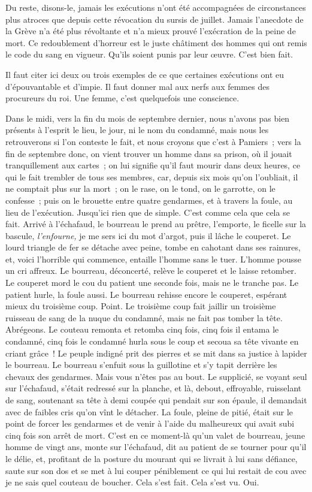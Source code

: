 \documentclass[french,twoside]{book} %
\begin{document}
Du reste, disons-le, jamais les exécutions n’ont été accompagnées de circonstances plus atroces que depuis cette révocation du sursis de juillet. Jamais l’anecdote de la Grève n’a été plus révoltante et n’a mieux prouvé l’exécration de la peine de mort. Ce redoublement d’horreur est le juste châtiment des hommes qui ont remis le code du sang en vigueur. Qu’ils soient punis par leur œuvre. C’est bien fait.\par
Il faut citer ici deux ou trois exemples de ce que certaines exécutions ont eu d’épouvantable et d’impie. Il faut donner mal aux nerfs aux femmes des procureurs du roi. Une femme, c’est quelquefois une conscience.\par
Dans le midi, vers la fin du mois de septembre dernier, nous n’avons pas bien présents à l’esprit le lieu, le jour, ni le nom du condamné, mais nous les retrouverons si l’on conteste le fait, et nous croyons que c’est à Pamiers ; vers la fin de septembre donc, on vient trouver un homme dans sa prison, où il jouait tranquillement aux cartes ; on lui signifie qu’il faut mourir dans deux heures, ce qui le fait trembler de tous ses membres, car, depuis six mois qu’on l’oubliait, il ne comptait plus sur la mort ; on le rase, on le tond, on le garrotte, on le confesse ; puis on le brouette entre quatre gendarmes, et à travers la foule, au lieu de l’exécution. Jusqu’ici rien que de simple. C’est comme cela que cela se fait. Arrivé à l’échafaud, le bourreau le prend au prêtre, l’emporte, le ficelle sur la bascule, \emph{l’enfourne,} je me sers ici du mot d’argot, puis il lâche le couperet. Le lourd triangle de fer se détache avec peine, tombe en  cahotant dans ses rainures, et, voici l’horrible qui commence, entaille l’homme sans le tuer. L’homme pousse un cri affreux. Le bourreau, déconcerté, relève le couperet et le laisse retomber. Le couperet mord le cou du patient une seconde fois, mais ne le tranche pas. Le patient hurle, la foule aussi. Le bourreau rehisse encore le couperet, espérant mieux du troisième coup. Point. Le troisième coup fait jaillir un troisième ruisseau de sang de la nuque du condamné, mais ne fait pas tomber la tête. Abrégeons. Le couteau remonta et retomba cinq fois, cinq fois il entama le condamné, cinq fois le condamné hurla sous le coup et secoua sa tête vivante en criant grâce ! Le peuple indigné prit des pierres et se mit dans sa justice à lapider le bourreau. Le bourreau s’enfuit sous la guillotine et s’y tapit derrière les chevaux des gendarmes. Mais vous n’êtes pas au bout. Le supplicié, se voyant seul sur l’échafaud, s’était redressé sur la planche, et là, debout, effroyable, ruisselant de sang, soutenant sa tête à demi coupée qui pendait sur son épaule, il demandait avec de faibles cris qu’on vînt le détacher. La foule, pleine de pitié, était sur le point de forcer les gendarmes et de venir à l’aide du malheureux qui avait subi cinq fois son arrêt de mort. C’est en ce moment-là qu’un valet de bourreau, jeune homme de vingt ans, monte sur l’échafaud, dit au patient de se tourner pour qu’il le délie, et, profitant de la posture du mourant qui se livrait à lui sans défiance, saute sur son dos et se met à lui couper péniblement ce qui lui restait de cou avec je ne sais quel couteau de boucher. Cela s’est fait. Cela s’est vu. Oui.\par
\end{document}
